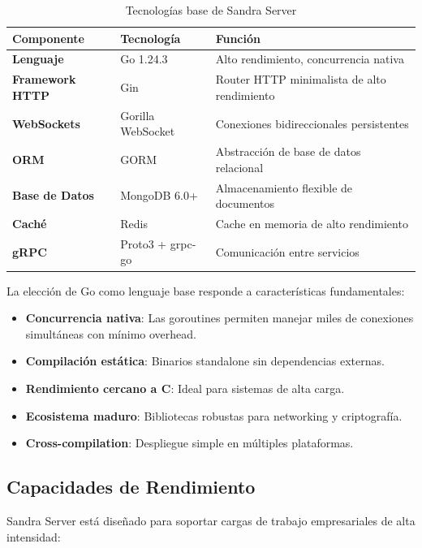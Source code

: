 \begin{table}[H]
\centering
\caption{Tecnologías base de Sandra Server}
\begin{tabular}{|l|l|p{8cm}|}
\hline
\textbf{Componente} & \textbf{Tecnología} & \textbf{Función} \\ \hline
\textbf{Lenguaje} & Go 1.24.3 & Alto rendimiento, concurrencia nativa \\ \hline
\textbf{Framework HTTP} & Gin & Router HTTP minimalista de alto rendimiento \\ \hline
\textbf{WebSockets} & Gorilla WebSocket & Conexiones bidireccionales persistentes \\ \hline
\textbf{ORM} & GORM & Abstracción de base de datos relacional \\ \hline
\textbf{Base de Datos} & MongoDB 6.0+ & Almacenamiento flexible de documentos \\ \hline
\textbf{Caché} & Redis & Cache en memoria de alto rendimiento \\ \hline
\textbf{gRPC} & Proto3 + grpc-go & Comunicación entre servicios \\ \hline
\end{tabular}
\end{table}

La elección de Go como lenguaje base responde a características fundamentales:

\begin{itemize}
\item \textbf{Concurrencia nativa}: Las goroutines permiten manejar miles de conexiones simultáneas con mínimo overhead.
\item \textbf{Compilación estática}: Binarios standalone sin dependencias externas.
\item \textbf{Rendimiento cercano a C}: Ideal para sistemas de alta carga.
\item \textbf{Ecosistema maduro}: Bibliotecas robustas para networking y criptografía.
\item \textbf{Cross-compilation}: Despliegue simple en múltiples plataformas.
\end{itemize}

\subsection{Capacidades de Rendimiento}

Sandra Server está diseñado para soportar cargas de trabajo empresariales de alta intensidad:

